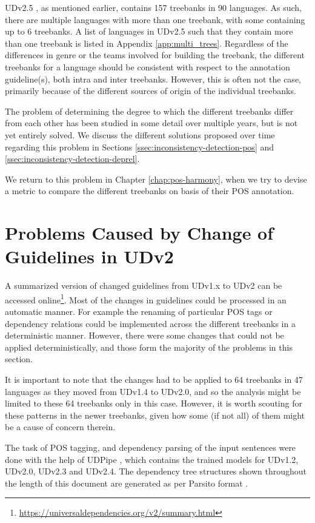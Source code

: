 UDv2.5 \citep{UDv2.5}, as mentioned earlier, contains 157 treebanks in 90 languages. As such, there are multiple languages with more than one treebank, with some containing up to 6 treebanks. A list of languages in UDv2.5 such that they contain more than one treebank is listed in Appendix \ref{app:multi_trees}. Regardless of the differences in genre or the teams involved for building the treebank, the different treebanks for a language should be consistent with respect to the annotation guideline(s), both intra and inter treebanks. However, this is often not the case, primarily because of the different sources of origin of the individual treebanks.

The problem of determining the degree to which the different treebanks differ from each other has been studied in some detail over multiple years, but is not yet entirely solved. We discuss the different solutions proposed over time regarding this problem in Sections \ref{ssec:inconsistency-detection-pos} and \ref{ssec:inconsistency-detection-deprel}.

We return to this problem in Chapter \ref{chap:pos-harmony}, when we try to devise a metric to compare the different treebanks on basis of their POS annotation.

\section{Problems Caused by Change of Guidelines in UDv2}
\label{ssec:guidelines}

A summarized version of changed guidelines from UDv1.x to UDv2 can be accessed online\footnote{\url{https://universaldependencies.org/v2/summary.html}}. Most of the changes in guidelines could be processed in an automatic manner. For example the renaming of particular POS tags or dependency relations could be implemented across the different treebanks in a deterministic manner. However, there were some changes that could not be applied deterministically, and those form the majority of the problems in this section.

It is important to note that the changes had to be applied to 64 treebanks in 47 languages as they moved from UDv1.4 to UDv2.0, and so the analysis might be limited to these 64 treebanks only in this case. However, it is worth scouting for these patterns in the newer treebanks, given how some (if not all) of them might be a cause of concern therein.

The task of POS tagging, and dependency parsing of the input sentences were done with the help of UDPipe \citep{UDPIPE}, which contains the trained models for UDv1.2, UDv2.0, UDv2.3 and UDv2.4. The dependency tree structures shown throughout the length of this document are generated as per Parsito format \citep{Parsito}.

